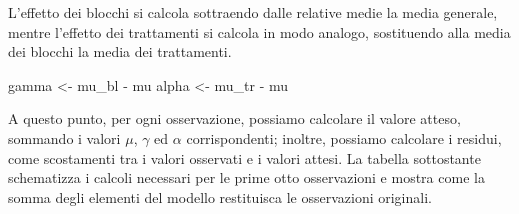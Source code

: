 \documentclass[a4paper,12pt,oneside]{book}
\newenvironment{Shaded}{\begin{snugshade}}{\end{snugshade}}
\newcommand{\SpecialCharTok}[1]{#1}
\newcommand{\DocumentationTok}[1]{#1}
\newcommand{\OtherTok}[1]{#1}
\newcommand{\FunctionTok}[1]{#1}
\newcommand{\NormalTok}[1]{#1}
\begin{document}
\begin{Shaded}
\end{Shaded}

L'effetto dei blocchi si calcola sottraendo dalle relative medie la media generale, mentre l'effetto dei trattamenti si calcola in modo analogo, sostituendo alla media dei blocchi la media dei trattamenti.

\begin{Shaded}
\begin{Highlighting}[]
\NormalTok{gamma }\OtherTok{\textless{}{-}}\NormalTok{ mu\_bl }\SpecialCharTok{{-}}\NormalTok{ mu}
\NormalTok{alpha }\OtherTok{\textless{}{-}}\NormalTok{ mu\_tr }\SpecialCharTok{{-}}\NormalTok{ mu}
\end{Highlighting}
\end{Shaded}

A questo punto, per ogni osservazione, possiamo calcolare il valore atteso, sommando i valori \(\mu\), \(\gamma\) ed \(\alpha\) corrispondenti; inoltre, possiamo calcolare i residui, come scostamenti tra i valori osservati e i valori attesi. La tabella sottostante schematizza i calcoli necessari per le prime otto osservazioni e mostra come la somma degli elementi del modello restituisca le osservazioni originali.
\end{document}

